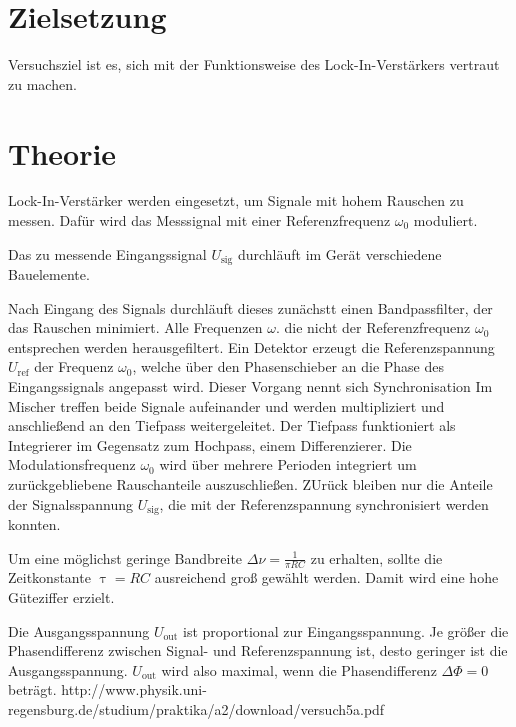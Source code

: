 \section{Zielsetzung}

Versuchsziel ist es, sich mit der Funktionsweise des Lock-In-Verstärkers vertraut zu machen.
\section{Theorie}
\label{sec:Theorie}

Lock-In-Verstärker werden eingesetzt, um Signale mit hohem Rauschen zu messen. Dafür wird das Messsignal mit einer Referenzfrequenz $\omega_0$ moduliert.

Das zu messende Eingangssignal $U_\mathup{sig}$ durchläuft im Gerät verschiedene Bauelemente.

Nach Eingang des Signals durchläuft dieses zunächstt einen Bandpassfilter, der das Rauschen minimiert. Alle Frequenzen $\omega$. die nicht der Referenzfrequenz $\omega_0$ entsprechen werden herausgefiltert.
Ein Detektor erzeugt die Referenzspannung $U_\mathup{ref}$ der Frequenz $\omega_0$, welche über den Phasenschieber an die Phase des Eingangssignals angepasst wird. Dieser Vorgang nennt sich Synchronisation Im Mischer treffen beide Signale aufeinander und werden multipliziert und anschließend an den Tiefpass weitergeleitet. Der Tiefpass funktioniert als Integrierer im Gegensatz zum Hochpass, einem Differenzierer. Die Modulationsfrequenz $\omega_0$ wird über mehrere Perioden integriert um zurückgebliebene Rauschanteile auszuschließen. ZUrück bleiben nur die Anteile der Signalsspannung $U_\mathup{sig}$, die mit der Referenzspannung synchronisiert werden konnten.

Um eine möglichst geringe Bandbreite $\Delta{\nu}=\frac{1}{\pi RC}$ zu erhalten, sollte die Zeitkonstante $\uptau=RC$ ausreichend groß gewählt werden. Damit wird eine hohe Güteziffer erzielt.

Die Ausgangsspannung $U_\mathup{out}$ ist proportional zur Eingangsspannung. Je größer die Phasendifferenz zwischen Signal- und Referenzspannung ist, desto geringer ist die Ausgangsspannung.  $U_\mathup{out}$ wird also maximal, wenn die Phasendifferenz $\Delta\Phi=0$ beträgt.
http://www.physik.uni-regensburg.de/studium/praktika/a2/download/versuch5a.pdf




